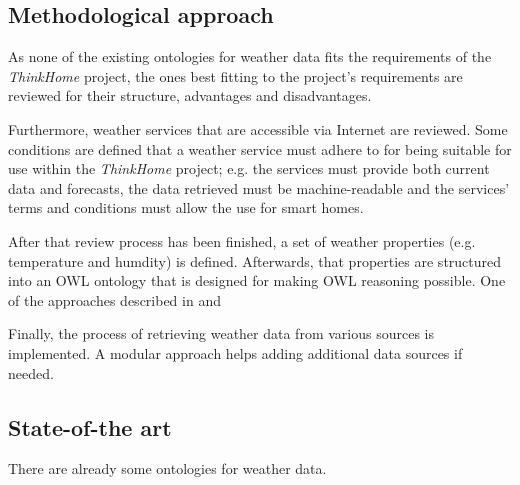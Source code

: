 \documentclass{scrartcl}
\begin{document}
\subsection*{Methodological approach}
As none of the existing ontologies for weather data fits the requirements of the \textit{ThinkHome} project, the ones best fitting to the project's requirements are reviewed for their structure, advantages and disadvantages.

Furthermore, weather services that are accessible via Internet are reviewed. Some conditions are defined that a weather service must adhere to for being suitable for use within the \textit{ThinkHome} project; e.g. the services must provide both current data and forecasts, the data retrieved must be machine-readable and the services' terms and conditions must allow the use for smart homes.

After that review process has been finished, a set of weather properties (e.g. temperature and humdity) is defined. Afterwards, that properties are structured into an OWL ontology that is designed for making OWL reasoning possible. One of the approaches described in \cite{Ontology101} and \cite{def} 

Finally, the process of retrieving weather data from various sources is implemented. A modular approach helps adding additional data sources if needed.

\subsection*{State-of-the art}

There are already some ontologies for weather data.


\end{document}
